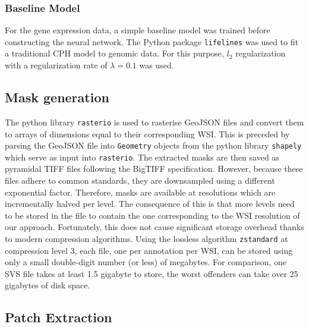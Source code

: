 \subsubsection{Baseline Model}
For the gene expression data, a simple baseline model was trained before constructing the neural network. The Python package \verb|lifelines| was used to fit a traditional CPH model to genomic data. For this purpose, \(l_2\) regularization with a regularization rate of \(\lambda = 0.1\) was used.

\subsection{Mask generation}
\label{MakeMasks}

The python library \verb|rasterio| is used to rasterise GeoJSON files and convert them to arrays of dimensions equal to their corresponding WSI. This is preceded by parsing the GeoJSON file into \verb|Geometry| objects from the python library \verb|shapely| which serve as input into \verb|rasterio|. The extracted masks are then saved as pyramidal TIFF files following the BigTIFF specification. However, because these files adhere to common standards, they are downsampled using a different exponential factor. Therefore, masks are available at resolutions which are incrementally halved per level. The consequence of this is that more levels need to be stored in the file to contain the one corresponding to the WSI resolution of our approach. Fortunately, this does not cause significant storage overhead thanks to modern compression algorithms. Using the lossless algorithm \verb|zstandard| at compression level 3, each file, one per annotation per WSI, can be stored using only a small double-digit number (or less) of megabytes. For comparison, one SVS file takes at least 1.5 gigabyte to store, the worst offenders can take over 25 gigabytes of disk space.

\subsection{Patch Extraction}
  \label{PatchExtr}

